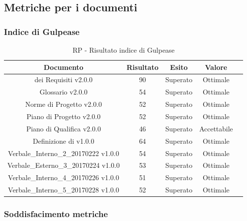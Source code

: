 \subsection{Metriche per i documenti}

\subsubsection{Indice di Gulpease}

\begin{table}[h]
	\begin{center}
		\begin{tabular}{|c|c|c|c|c|}
			\hline
			\textbf{Documento}	& \textbf{Risultato} & \textbf{Esito} & \textbf{Valore}\\
			\hline
		 \termine{Analisi} dei Requisiti v2.0.0 &	90 & Superato & Ottimale\\
			\hline
			Glossario v2.0.0 &	54 & Superato & Ottimale\\
			\hline
			Norme di Progetto v2.0.0 &	52 & Superato & Ottimale\\
			\hline
			Piano di Progetto v2.0.0	&	52 & Superato & Ottimale\\
			\hline
			Piano di Qualifica v2.0.0	&	46 & Superato & Accettabile\\
			\hline
			Definizione di \termine{Prodotto} v1.0.0	&	64 & Superato & Ottimale\\
			\hline
			Verbale\_Interno\_2\_20170222 v1.0.0	&	54 & Superato & Ottimale\\
			\hline
			Verbale\_Esterno\_3\_20170224 v1.0.0	&	53 & Superato & Ottimale\\
			\hline
			Verbale\_Interno\_4\_20170226 v1.0.0	&	51 & Superato & Ottimale\\
			\hline
			Verbale\_Interno\_5\_20170228 v1.0.0	&	52 & Superato & Ottimale\\
			\hline
		\end{tabular}
	\end{center}
	\caption{RP - Risultato indice di Gulpease}
\end{table}

\subsubsection{Soddisfacimento metriche}

